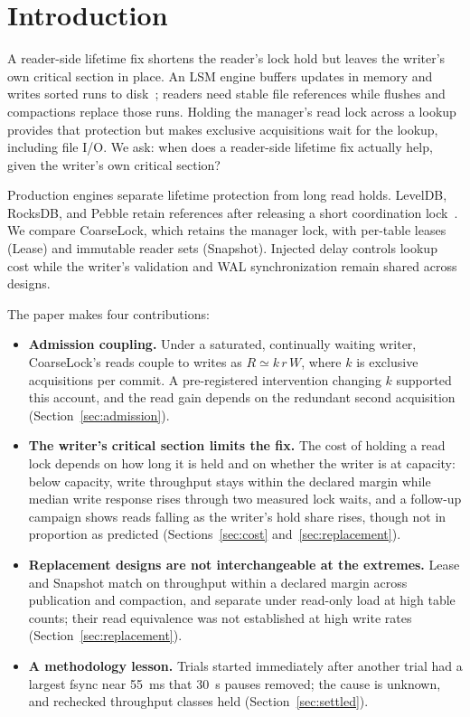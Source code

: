\documentclass[conference]{IEEEtran}
\begin{document}
\section{Introduction}
\label{sec:introduction}
A reader-side lifetime fix shortens the reader's lock hold but leaves the writer's own critical section in place. An LSM engine buffers updates in memory and writes sorted runs to disk~\cite{oneil1996lsm,luo2020}; readers need stable file references while flushes and compactions replace those runs. Holding the manager's read lock across a lookup provides that protection but makes exclusive acquisitions wait for the lookup, including file I/O. We ask: when does a reader-side lifetime fix actually help, given the writer's own critical section?

Production engines separate lifetime protection from long read holds. LevelDB, RocksDB, and Pebble retain references after releasing a short coordination lock~\cite{leveldb,rocksdb,pebble}. We compare CoarseLock, which retains the manager lock, with per-table leases (Lease) and immutable reader sets (Snapshot). Injected delay controls lookup cost while the writer's validation and WAL synchronization remain shared across designs.

The paper makes four contributions:
\begin{itemize}
\item \textbf{Admission coupling.} Under a saturated, continually waiting writer, CoarseLock's reads couple to writes as $R\simeq k\,r\,W$, where $k$ is exclusive acquisitions per commit. A pre-registered intervention changing $k$ supported this account, and the read gain depends on the redundant second acquisition (Section~\ref{sec:admission}).
\item \textbf{The writer's critical section limits the fix.} The cost of holding a read lock depends on how long it is held and on whether the writer is at capacity: below capacity, write throughput stays within the declared margin while median write response rises through two measured lock waits, and a follow-up campaign shows reads falling as the writer's hold share rises, though not in proportion as predicted (Sections~\ref{sec:cost} and~\ref{sec:replacement}).
\item \textbf{Replacement designs are not interchangeable at the extremes.} Lease and Snapshot match on throughput within a declared margin across publication and compaction, and separate under read-only load at high table counts; their read equivalence was not established at high write rates (Section~\ref{sec:replacement}).
\item \textbf{A methodology lesson.} Trials started immediately after another trial had a largest fsync near 55~ms that 30~s pauses removed; the cause is unknown, and rechecked throughput classes held (Section~\ref{sec:settled}).
\end{itemize}
\end{document}
